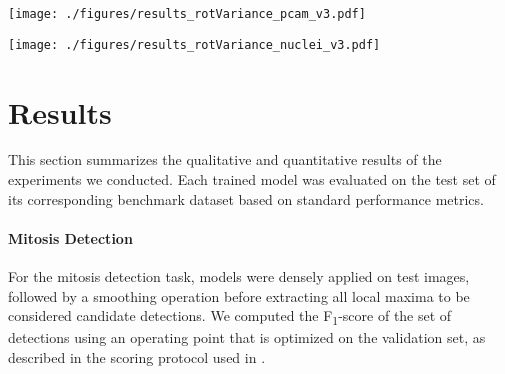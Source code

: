 \documentclass[twocolumn,final]{article}
\newcommand{\fscore}[1]{F\textsubscript{#1}-score}
\begin{document}
\begin{figure*}[ht!]
\begin{center}
\texttt{[image: ./figures/results\_rotVariance\_pcam\_v3.pdf]}
\caption{
\footnotesize
Example of image patches selected from the test set of the \textit{PCam} benchmark, for which pixels in the center area were classified as \textit{tumor tissue}.
Below each, polar plots show model predictions (distance from origin) as a function of the orientation of the input (angle coordinate) using steps of  rad.
Selected models are indicated with colors, and correspond to the best obtained models that were trained without reduced data regime over repeats (based on their accuracy).
}
\label{fig:resultsQualitativePCam}
\end{center}
\end{figure*}


\begin{figure*}[ht!]
\begin{center}
\texttt{[image: ./figures/results\_rotVariance\_nuclei\_v3.pdf]}
\caption{\footnotesize
Example of image patches selected from the test set of the nuclei segmentation benchmark (column 1-2: breast tissue, column 3-4: prostate tissue, column 5: kidney tissue, column 6: liver).
For each image, and a selection of models, the raw predictions of the nucleus boundary class were computed and stored for the set of rotated inputs using steps of  rad.
Predictions were re-aligned and their means were mapped to gray-scale and the standard deviations of the predictions were mapped to a white-to-red color scale.
The overlap of these statistics is shown below each original image.
Selected models are the best obtained models that were trained without reduced data regime over repeats (based on their \fscore{1}).
}
\label{fig:resultsQualitativeNuclei}
\end{center}
\end{figure*}

\section{Results}
\label{sec:results}
This section summarizes the qualitative and quantitative results of the experiments we conducted.
Each trained model was evaluated on the test set of its corresponding benchmark dataset based on standard performance metrics.

\paragraph{Mitosis Detection}
For the mitosis detection task, models were densely applied on test images, followed by a smoothing operation before extracting all local maxima to be considered candidate detections.
We computed the \fscore{1} of the set of detections using an operating point that is optimized on the validation set, as described in the scoring protocol used in \citep{veta2015assessment}.
\end{document}
